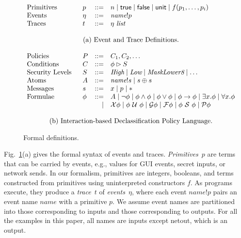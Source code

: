 \documentclass{llncs}
\newcommand{\code}[1]{\textsf{#1}} \newcommand{\bcode}[1]{\texttt{#1}}
\newcommand{\sfmt}[1]{\textsf{#1}}
\newcommand{\sch}{\textit{name}}
\newcommand{\sfalse}{\sfmt{false}}
\newcommand{\strue}{\sfmt{true}}
\newcommand{\sunit}{\sfmt{unit}}
\newcommand{\xv}{p}
\newcommand{\atom}{A}
\newcommand{\tr}{t\xspace}
\newcommand{\tnext}{\mathcal{X}}
\newcommand{\talways}{\mathcal{G}}
\newcommand{\tfuture}{\mathcal{F}}
\newcommand{\tuntil}{~\mathcal{U}~}
\newcommand{\tsince}{~\mathcal{S}~}
\newcommand{\tpast}{\mathcal{P}}
\newcommand{\limplies}{\rightarrow}
\newcommand{\evt}{\eta}
\begin{document}
\begin{figure}[t!]
  \small
  \centering
  \begin{displaymath}
    \begin{array}{p{1in}lrl}
      Primitives & \xv & ::= & n \mid \strue \mid \sfalse \mid \sunit \mid f(\xv_1, \ldots, \xv_i) \\
      Events & \evt & ::= & \sch ! p \\
      Traces & t & ::= & \evt ~ \textit{list} \\
      \\
      \multicolumn{4}{c}{\textrm{(a) Event and Trace Definitions.}} \\
      \\
      Policies & P & ::= & C_1, C_2, \ldots \\
      Conditions & C & ::= & \phi \rhd S\\
      Security Levels & S & ::= & \textit{High} \mid \textit{Low} \mid
      \textit{MaskLower8} \mid \ldots \\
      Atoms & \atom & ::= & \sch!s \mid s \oplus s \\
      Messages & s & ::= & x \mid p \mid \ast \\
      Formulae & \phi & ::= &
      \atom
      \mid \neg \phi
      \mid \phi \wedge \phi
      \mid \phi \vee \phi
      \mid \phi \limplies \phi
      \mid \exists x.\phi 
      \mid \forall x.\phi \\
      && \mid  & \tnext \phi
      \mid \phi \tuntil \phi
      \mid \talways \phi
      \mid \tfuture \phi
      \mid \phi \tsince \phi
      \mid \tpast \phi \\
      \\
      \multicolumn{4}{c}{\textrm{(b) Interaction-based Declassification Policy Language.}}
    \end{array}
  \end{displaymath}
  \caption{Formal definitions.}
  \label{fig:formalism}
\end{figure}

Fig.~\ref{fig:formalism}(a) gives the formal syntax of events and
traces.  \emph{Primitives}~$p$ are terms that can be carried by
events, e.g., values for GUI events, secret inputs, or network
sends.  In our formalism, primitives are integers, booleans, and terms
constructed from primitives using uninterpreted constructors $f$.  As
programs execute, they produce a \emph{trace}~$\tr$ of
\emph{events}~$\evt$, where each event $\sch!p$ pairs an event name
$\sch$ with a primitive $p$. We assume event names are partitioned
into those corresponding to inputs and those corresponding to
outputs. For all the examples in this paper, all names are inputs
except \code{netout}, which is an output.
\end{document}
